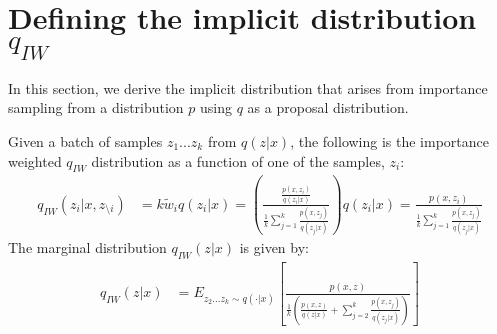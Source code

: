 \documentclass{article} %
\begin{document}
\section{Defining the implicit distribution \texorpdfstring{$q_{IW}$}{}}


In this section, we derive the implicit distribution that arises from importance sampling from a distribution $p$ using $q$ as a proposal distribution.

Given a batch of samples $z_{1}...z_{k}$ from $q(z|x)$, the following is the importance weighted $q_{IW}$ distribution as a function of one of the samples, $z_i$:
\begin{align} 
    q_{IW}(z_i|x,z_{\setminus i}) &= k \tilde{w}_i q(z_i|x)
    = \left( \frac{ \frac{p(x,z_i)}{q(z_i|x)}}{  \frac{1}{k}   \sum_{j=1}^k \frac{p(x,z_j)}{q(z_j|x)}}  \right) q(z_i|x) 
    = \frac{p(x,z_i)}{\frac{1}{k}   \sum_{j=1}^k \frac{p(x,z_j)}{q(z_j|x)}} 
\end{align}
The marginal distribution $q_{IW}(z|x)$ is given by:
\begin{align} 
    q_{IW}(z|x) &= E_{z_{2}...z_{k} \sim q(\cdot |x)} \left[ \frac{p(x,z)}{  \frac{1}{k} \left( \frac{p(x,z)}{q(z|x)}+ \sum_{j=2}^k \frac{p(x,z_j)}{q(z_j|x)} \right) } \right] \label{marg} %
\end{align}


\end{document}

